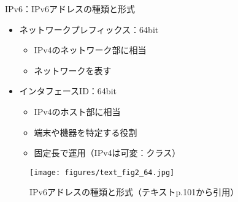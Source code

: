 \documentclass[12pt,aspectratio=169]{beamer}
\begin{document}
\begin{frame}{IPv6：IPv6アドレスの種類と形式}

  \begin{minipage}{0.48\textwidth}
    \small
    \begin{itemize}
      \item ネットワークプレフィックス：64bit
      \begin{itemize}
        \item IPv4のネットワーク部に相当
        \item ネットワークを表す
      \end{itemize}
      \item インタフェースID：64bit
      \begin{itemize}
        \item IPv4のホスト部に相当
        \item 端末や機器を特定する役割
        \item 固定長で運用（IPv4は可変：クラス）
      \end{itemize}
    \end{itemize}

  \end{minipage}
  \hfill
  \begin{minipage}{0.48\textwidth}
    \vspace{-1\baselineskip}
    \centering
    \begin{figure}
      \centering
      \texttt{[image: figures/text\_fig2\_64.jpg]}
      \label{fig:text_fig2_64}
      \caption{IPv6アドレスの種類と形式（テキストp.101から引用）}
    \end{figure}
  \end{minipage}

\end{frame}
\end{document}
